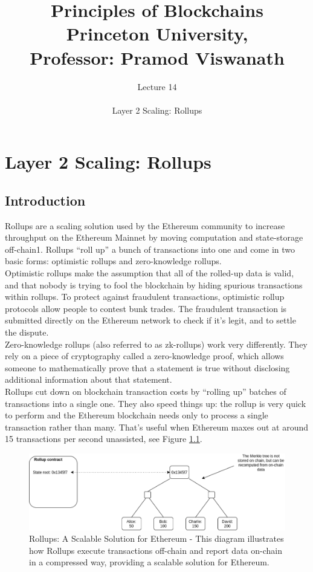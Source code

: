 \documentclass{report}
\title{\Huge{Principles of Blockchains \\ Princeton University,\\
		Professor: Pramod Viswanath}}
\author{\huge{Lecture 14} \\\\ Layer 2 Scaling: Rollups}
\begin{document}
\maketitle
\newpage%
\tableofcontents
\pagebreak

\chapter{Layer 2 Scaling: Rollups}

\section{Introduction}
Rollups are a scaling solution used by the Ethereum community to increase throughput on the Ethereum Mainnet by moving computation and state-storage off-chain1. Rollups “roll up” a bunch of transactions into one and come in two basic forms: optimistic rollups and zero-knowledge rollups.\\
Optimistic rollups make the assumption that all of the rolled-up data is valid, and that nobody is trying to fool the blockchain by hiding spurious transactions within rollups. To protect against fraudulent transactions, optimistic rollup protocols allow people to contest bunk trades. The fraudulent transaction is submitted directly on the Ethereum network to check if it’s legit, and to settle the dispute.\\
Zero-knowledge rollups (also referred to as zk-rollups) work very differently. They rely on a piece of cryptography called a zero-knowledge proof, which allows someone to mathematically prove that a statement is true without disclosing additional information about that statement.\\
Rollups cut down on blockchain transaction costs by “rolling up” batches of transactions into a single one. They also speed things up: the rollup is very quick to perform and the Ethereum blockchain needs only to process a single transaction rather than many. That’s useful when Ethereum maxes out at around 15 transactions per second unassisted, see Figure \ref{fig:f1}.
\begin{center}
	\begin{figure}
		\centering
		\includegraphics[width=0.8\linewidth]{Fig/F1}
		\caption{Rollups: A Scalable Solution for Ethereum - This diagram illustrates how Rollups execute transactions off-chain and report data on-chain in a compressed way, providing a scalable solution for Ethereum.
		}
		\label{fig:f1}
	\end{figure}
\end{center}
\end{document}
